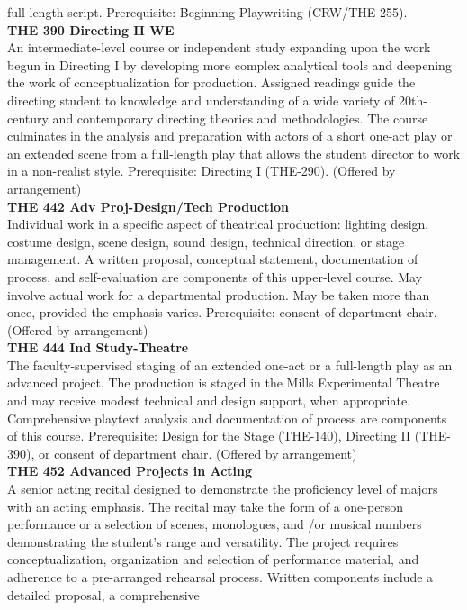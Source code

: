 \documentclass[
  letterpaper,
]{scrbook}
\begin{document}
full-length script. Prerequisite: Beginning Playwriting (CRW/THE-255).\\
\textbf{THE 390 Directing II WE}\\
An intermediate-level course or independent study expanding upon the
work begun in Directing I by developing more complex analytical tools
and deepening the work of conceptualization for production. Assigned
readings guide the directing student to knowledge and understanding of a
wide variety of 20th-century and contemporary directing theories and
methodologies. The course culminates in the analysis and preparation
with actors of a short one-act play or an extended scene from a
full-length play that allows the student director to work in a
non-realist style. Prerequisite: Directing I (THE-290). (Offered by
arrangement)\\
\textbf{THE 442 Adv Proj-Design/Tech Production}\\
Individual work in a specific aspect of theatrical production: lighting
design, costume design, scene design, sound design, technical direction,
or stage management. A written proposal, conceptual statement,
documentation of process, and self-evaluation are components of this
upper-level course. May involve actual work for a departmental
production. May be taken more than once, provided the emphasis varies.
Prerequisite: consent of department chair. (Offered by arrangement)\\
\textbf{THE 444 Ind Study-Theatre}\\
The faculty-supervised staging of an extended one-act or a full-length
play as an advanced project. The production is staged in the Mills
Experimental Theatre and may receive modest technical and design
support, when appropriate. Comprehensive playtext analysis and
documentation of process are components of this course. Prerequisite:
Design for the Stage (THE-140), Directing II (THE-390), or consent of
department chair. (Offered by arrangement)\\
\textbf{THE 452 Advanced Projects in Acting}\\
A senior acting recital designed to demonstrate the proficiency level of
majors with an acting emphasis. The recital may take the form of a
one-person performance or a selection of scenes, monologues, and /or
musical numbers demonstrating the student's range and versatility. The
project requires conceptualization, organization and selection of
performance material, and adherence to a pre-arranged rehearsal process.
Written components include a detailed proposal, a comprehensive
\end{document}
